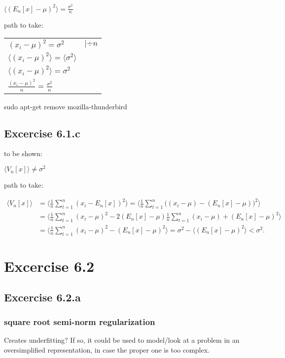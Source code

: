 \documentclass[a4paper,headings=small]{scrartcl}
\numberwithin{equation}{section} %
\numberwithin{figure}{section}   %
\begin{document}
$\langle (E_n[x] - \mu)^2 \rangle = \frac{\sigma^2}{n}$

path to take:

\begin{tabular}{lc}
$(x_i − \mu)^2 = \sigma^2$ & $| \div n$ \\

$\langle (x_i − \mu)^2 \rangle = \langle \sigma^2 \rangle$ \\

$\langle (x_i − \mu)^2 \rangle = \sigma^2$ \\

$\frac{(x_i − \mu)^2}{n} = \frac{\sigma^2}{n}$ \\


\end{tabular}

sudo apt-get remove mozilla-thunderbird
\subsection{Excercise 6.1.c}

to be shown:

$\langle V_n[x] \rangle \neq \sigma^2$

path to take:

\begin{align}
\langle V_n[x] \rangle
	&= \langle \frac{1}{n}\sum_{t=1}^n (x_i-E_n[x])^2 \rangle
		= \langle \frac{1}{n}\sum_{t=1}^n \big((x_i-\mu)-(E_n[x]-\mu)\big)^2 \rangle \\
	&= \langle \frac{1}{n}\sum_{t=1}^n (x_i-\mu)^2 -
								2(E_n[x]-\mu)\frac{1}{n}\sum_{t=1}^n (x_i-\mu) +
								(E_n[x]-\mu)^2 \rangle \\
	&= \langle \frac{1}{n}\sum_{t=1}^n (x_i-\mu)^2 - (E_n[x]-\mu)^2 \rangle
		= \sigma^2 - \langle (E_n[x]-\mu)^2 \rangle < \sigma^2.
\end{align}


\section{Excercise 6.2}

\subsection{Excercise 6.2.a}

\subsubsection{square root semi-norm regularization}
Creates underfitting?
If so, it could be used to model/look at a problem in an oversimplified representation,
in case the proper one is too complex.
\end{document}
